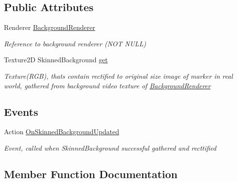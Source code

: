 \subsection*{Public Attributes}
\begin{DoxyCompactItemize}
\item 
Renderer \hyperlink{class_mo__2015__11__30___bichik_1_1_skinned_background_trackable_event_handler_aff44a53dec36359e8e9550549fbc150a_aff44a53dec36359e8e9550549fbc150a}{Background\+Renderer}
\begin{DoxyCompactList}\small\item\em Reference to background renderer (N\+O\+T N\+U\+L\+L) \end{DoxyCompactList}\item 
Texture2\+D Skinned\+Background \hyperlink{class_mo__2015__11__30___bichik_1_1_skinned_background_trackable_event_handler_afa7ab9d224b5062182150daef543e2eb_afa7ab9d224b5062182150daef543e2eb}{get}
\begin{DoxyCompactList}\small\item\em Texture(\+R\+G\+B), that\textquotesingle{}s contain rectified to original size image of marker in real world, gathered from background video texture of \hyperlink{class_mo__2015__11__30___bichik_1_1_skinned_background_trackable_event_handler_aff44a53dec36359e8e9550549fbc150a_aff44a53dec36359e8e9550549fbc150a}{Background\+Renderer} \end{DoxyCompactList}\end{DoxyCompactItemize}
\subsection*{Events}
\begin{DoxyCompactItemize}
\item 
Action \hyperlink{class_mo__2015__11__30___bichik_1_1_skinned_background_trackable_event_handler_a4b3a34147765b3eabbe6e87b82144ee7_a4b3a34147765b3eabbe6e87b82144ee7}{On\+Skinned\+Background\+Updated}
\begin{DoxyCompactList}\small\item\em Event, called when Skinned\+Background successful gathered and recttified \end{DoxyCompactList}\end{DoxyCompactItemize}


\subsection{Member Function Documentation}
\hypertarget{class_mo__2015__11__30___bichik_1_1_skinned_background_trackable_event_handler_a5acc4c7e682ffb65ea3ee251767f6f42_a5acc4c7e682ffb65ea3ee251767f6f42}{}
